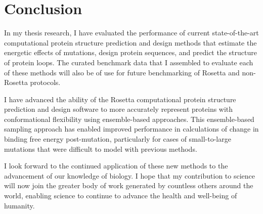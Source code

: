 \chapter{Conclusion}

In my thesis research, I have evaluated the performance of current state-of-the-art computational protein structure prediction and design methods that estimate the energetic effects of mutations, design protein sequences, and predict the structure of protein loops. The curated benchmark data that I assembled to evaluate each of these methods will also be of use for future benchmarking of Rosetta and non-Rosetta protocols.

I have advanced the ability of the Rosetta computational protein structure prediction and design software to more accurately represent proteins with conformational flexibility using ensemble-based approaches.
This ensemble-based sampling approach has enabled improved performance in calculations of change in binding free energy post-mutation, particularly for cases of small-to-large mutations that were difficult to model with previous methods.

I look forward to the continued application of these new methods to the advancement of our knowledge of biology. I hope that my contribution to science will now join the greater body of work generated by countless others around the world, enabling science to continue to advance the health and well-being of humanity.